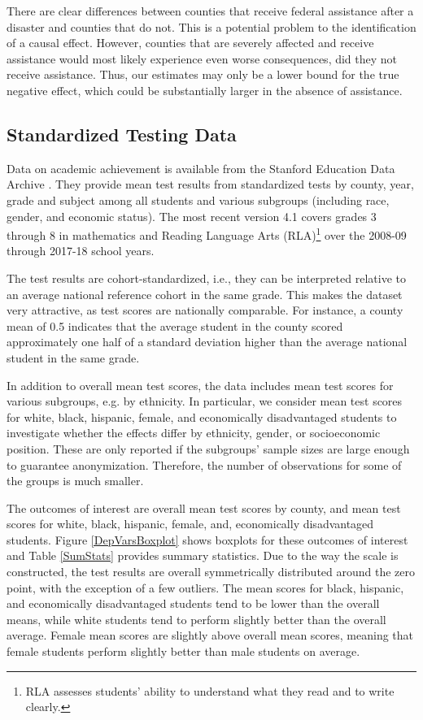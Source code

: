 There are clear differences between counties that receive federal assistance after a disaster and counties that do not. This is a potential problem to the identification of a causal effect. However, counties that are severely affected and receive assistance would most likely experience even worse consequences, did they not receive assistance. Thus, our estimates may only be a lower bound for the true negative effect, which could be substantially larger in the absence of assistance.


\subsection{Standardized Testing Data}

Data on academic achievement is available from the Stanford Education Data Archive \citep{SEDA}. They provide mean test results from standardized tests by county, year, grade and subject among all students and various subgroups (including race, gender, and economic status). The most recent version 4.1 covers grades 3 through 8 in mathematics and Reading Language Arts (RLA)\footnote{RLA assesses students' ability to understand what they read and to write clearly.} over the 2008-09 through 2017-18 school years.

The test results are cohort-standardized, i.e., they can be interpreted relative to an average national reference cohort in the same grade. This makes the dataset very attractive, as test scores are nationally comparable. For instance, a county mean of 0.5 indicates that the average student in the county scored approximately one half of a standard deviation higher than the average national student in the same grade.

In addition to overall mean test scores, the data includes mean test scores for various subgroups, e.g. by ethnicity. In particular, we consider mean test scores for white, black, hispanic, female, and economically disadvantaged students to investigate whether the effects differ by ethnicity, gender, or socioeconomic position. These are only reported if the subgroups' sample sizes are large enough to guarantee anonymization. Therefore, the number of observations for some of the groups is much
smaller.

The outcomes of interest are overall mean test scores by county, and mean test scores for white, black, hispanic, female, and, economically disadvantaged students. Figure \ref{DepVarsBoxplot} shows boxplots for these outcomes of interest and Table \ref{SumStats} provides summary statistics. Due to the way the scale is constructed, the test results are overall symmetrically distributed around the zero point, with the exception of a few outliers. The mean scores for black, hispanic, and economically disadvantaged students tend to be lower than the overall means, while white students tend to perform slightly better than the overall average. Female mean scores are slightly above overall mean scores, meaning that female students perform slightly better than male students on average.

